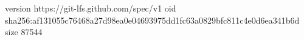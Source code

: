 version https://git-lfs.github.com/spec/v1
oid sha256:af131055c76468a27d98ea0e04693975dd1fc63a0829bfc811c4e0d6ea341b6d
size 87544
